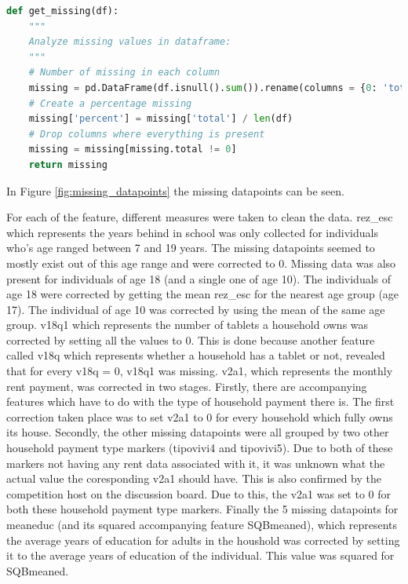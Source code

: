 \documentclass[preprint,12pt]{elsarticle}
\begin{document}
\begin{lstlisting}[language=Python, label={code:missing_data}, caption={Analyze dataset for missing values}]
def get_missing(df):
    """
    Analyze missing values in dataframe:
    """
    # Number of missing in each column
    missing = pd.DataFrame(df.isnull().sum()).rename(columns = {0: 'total'})
    # Create a percentage missing
    missing['percent'] = missing['total'] / len(df)
    # Drop columns where everything is present
    missing = missing[missing.total != 0]
    return missing
\end{lstlisting}

In Figure \ref{fig:missing_datapoints} the missing datapoints can be seen.

For each of the feature, different measures were taken to clean the data. rez{\_}esc which represents the years behind in school was only collected for individuals who's age ranged between 7 and 19 years. The missing datapoints seemed to mostly exist out of this age range and were corrected to 0. Missing data was also present for individuals of age 18 (and a single one of age 10). The individuals of age 18 were corrected by getting the mean rez{\_}esc for the nearest age group (age 17). The individual of age 10 was corrected by using the mean of the same age group. v18q1 which represents the number of tablets a household owns was corrected by setting all the values to 0. This is done because another feature called v18q which represents whether a household has a tablet or not, revealed that for every v18q = 0, v18q1 was missing. v2a1, which represents the monthly rent payment, was corrected in two stages. Firstly, there are accompanying features which have to do with the type of household payment there is. The first correction taken place was to set v2a1 to 0 for every household which fully owns its house. Secondly, the other missing datapoints were all grouped by two other household payment type markers (tipovivi4 and tipovivi5). Due to both of these markers not having any rent data associated with it, it was unknown what the actual value the coresponding v2a1 should have. This is also confirmed by the competition host on the discussion board. Due to this, the v2a1 was set to 0 for both these household payment type markers. Finally the 5 missing datapoints for meaneduc (and its squared accompanying feature SQBmeaned), which represents the average years of education for adults in the houshold was corrected by setting it to the average years of education of the individual. This value was squared for SQBmeaned.
\end{document}
